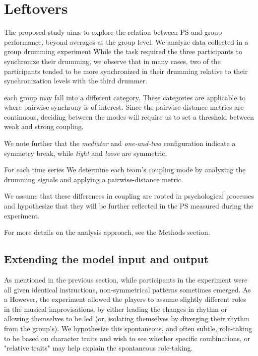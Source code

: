 \documentclass[a4paper, 11pt]{report}      %
\begin{document}
\section{Leftovers}
The proposed study aims to explore the relation between PS and group performance, beyond averages at the group level. We analyze data collected in a group drumming experiment 
While the task required the three participants to synchronize their drumming, we observe that in many cases, two of the participants tended to be more synchronized in their drumming relative to their synchronization levels with the third drummer.




each group may fall into a different category. 
These categories are applicable to  where pairwise synchrony is of interest. Since the pairwise distance metrics are continuous, deciding between the modes will require us to set a threshold between weak and strong coupling. 

We note further that the \emph{mediator} and \emph{one-and-two} configuration indicate a symmetry break, while \emph{tight} and \emph{loose} are symmetric.


For each time series 
We determine each team's coupling mode by analyzing the drumming signals and applying a pairwise-distance metric. 

We assume that these differences in coupling are rooted in psychological processes and hypothesize that they will be further reflected in the PS measured during the experiment.




For more details on the analysis approach, see the Methods section.



\subsection{Extending the model input and output}
As mentioned in the previous section, while participants in the experiment were all given identical instructions, non-symmetrical patterns sometimes emerged. As a However, the experiment allowed the players to assume slightly different roles in the musical improvisations, by either leading the changes in rhythm or allowing themselves to be led (or, isolating themselves by diverging their rhythm from the group's). We hypothesize this spontaneous, and often subtle, role-taking to be based on character traits and wish to see whether specific combinations, or "relative traits" may help explain the spontaneous role-taking.
\end{document}
